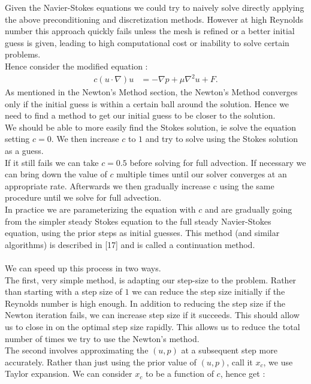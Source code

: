 \documentclass[11pt,twoside,a4paper]{article}
\begin{document}
Given the Navier-Stokes equations we could try to naively solve directly applying the above preconditioning and discretization methods. However at high Reynolds number this approach quickly fails unless the mesh is refined or a better initial guess is given, leading to high computational cost or inability to solve certain problems.\\
Hence consider the modified equation :
\begin{align}
c (u \cdot \nabla) u &= -\nabla p + \mu \nabla^2 u + F .
\end{align}
As mentioned in the Newton's Method section, the Newton's Method converges only if the initial guess is within a certain ball around the solution. Hence we need to find a method to get our initial guess to be closer to the solution.\\
We should be able to more easily find the Stokes solution, ie solve the equation setting $c = 0$. We then increase $c$ to $1$ and try to solve using the Stokes solution as a guess. \\
If it still fails we can take $c =0.5$ before solving for full advection. If necessary we can bring down the value of $c$ multiple times until our solver converges at an appropriate rate. Afterwards we then gradually increase c using the same procedure until we solve for full advection.\\
In practice we are parameterizing the equation with $c$ and are gradually going from the simpler steady Stokes equation to the full steady Navier-Stokes equation, using the prior steps as initial guesses. This method (and similar algorithms) is described in [17] and is called a continuation method.\\
\\
We can speed up this process in two ways.\\
The first, very simple method, is adapting our step-size to the problem. Rather than starting with a step size of $1$ we can reduce the step size initially if the Reynolds number is high enough. In addition to reducing the step size if the Newton iteration fails, we can increase step size if it succeeds. This should allow us to close in on the optimal step size rapidly. This allows us to reduce the total number of times we try to use the Newton's method.\\
The second involves approximating the $(u,p)$ at a subsequent step more accurately. Rather than just using the prior value of $(u,p)$, call it $x_c$, we use Taylor expansion. We can consider $x_c$ to be a function of $c$, hence get :
\end{document}
